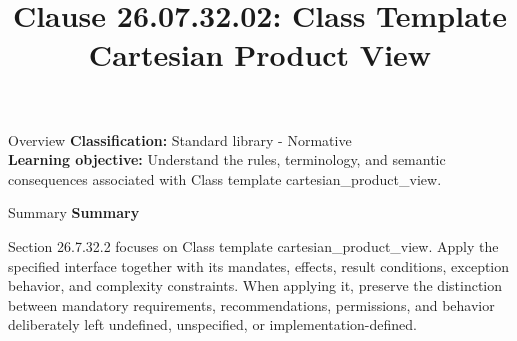 \documentclass[10pt,letterpaper]{article}
\title{Clause 26.07.32.02: Class Template Cartesian Product View}
\author{}
\date{}
\begin{document}
\maketitle
\begin{CornellOverviewBox}{Overview}
\textbf{Classification:} Standard library - Normative\\[2pt]
\textbf{Learning objective:} Understand the rules, terminology, and semantic consequences associated with Class template cartesian\_product\_view.
\end{CornellOverviewBox}\begin{CornellSummaryBox}{Summary}
{\sffamily\bfseries\color{Accent} Summary}\par\vspace{3pt}Section 26.7.32.2 focuses on Class template cartesian\_product\_view. Apply the specified interface together with its mandates, effects, result conditions, exception behavior, and complexity constraints. When applying it, preserve the distinction between mandatory requirements, recommendations, permissions, and behavior deliberately left undefined, unspecified, or implementation-defined.
\end{CornellSummaryBox}
\end{document}
